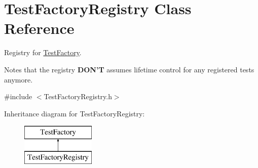 \hypertarget{class_test_factory_registry}{\section{Test\-Factory\-Registry Class Reference}
\label{class_test_factory_registry}
}


Registry for \hyperlink{class_test_factory}{Test\-Factory}.

Notes that the registry {\bfseries D\-O\-N'T} assumes lifetime control for any registered tests anymore.  




{\ttfamily \#include $<$Test\-Factory\-Registry.\-h$>$}

Inheritance diagram for Test\-Factory\-Registry\-:\begin{figure}[H]
\begin{center}
\leavevmode
\includegraphics[height=2.000000cm]{class_test_factory_registry}
\end{center}
\end{figure}

